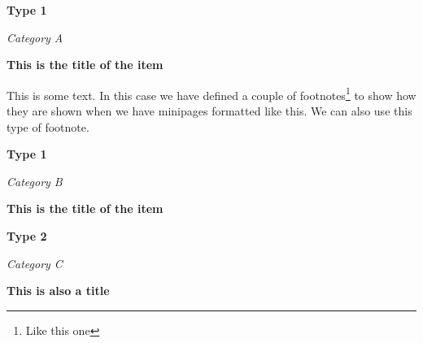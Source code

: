 
\noindent
{}
\begin{minipage}[t]{0.15\textwidth}
	\centering
	\textbf{Type 1} \par
	\textit{Category A} \par
	\label{example-1:1.a}
\end{minipage}
\hspace{0.5cm}
\begin{minipage}[t]{0.8\textwidth}
	\textbf{This is the title of the item} \par
	This is some text.  In this case we have defined a couple of footnotes\footnote{Like this one} to show how they are shown when we have minipages formatted like this.  We can also use this type of footnote.
\end{minipage}
\vspace{0.5cm}

\noindent
{}
\begin{minipage}[t]{0.15\textwidth}
	\centering
	\textbf{Type 1} \par
	\textit{Category B} \par
	\label{example-1:1.b}
\end{minipage}
\hspace{0.5cm}
\begin{minipage}[t]{0.8\textwidth}
	\textbf{This is the title of the item} \par
	\lipsum[4]
\end{minipage}
\vspace{0.5cm}

\noindent
{}
\begin{minipage}[t]{0.15\textwidth}
	\centering
	\textbf{Type 2} \par
	\textit{Category C} \par
	\label{example-1:2.c}
\end{minipage}
\hspace{0.5cm}
\begin{minipage}[t]{0.8\textwidth}
	\textbf{This is also a title} \par
	\lipsum[5]
\end{minipage}
\vspace{0.5cm}
